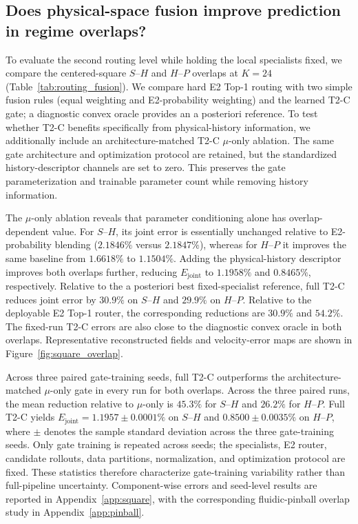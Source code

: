 \subsection{Does physical-space fusion improve prediction in regime overlaps?}
To evaluate the second routing level while holding the local specialists fixed, we compare the centered-square $S$--$H$ and $H$--$P$ overlaps at $K=24$ (Table~\ref{tab:routing_fusion}). We compare hard E2 Top-1 routing with two simple fusion rules (equal weighting and E2-probability weighting) and the learned T2-C gate; a diagnostic convex oracle provides an a posteriori reference. To test whether T2-C benefits specifically from physical-history information, we additionally include an architecture-matched T2-C $\mu$-only ablation. The same gate architecture and optimization protocol are retained, but the standardized history-descriptor channels are set to zero. This preserves the gate parameterization and trainable parameter count while removing history information.


The $\mu$-only ablation reveals that parameter conditioning alone has overlap-dependent value. For $S$--$H$, its joint error is essentially unchanged relative to E2-probability blending ($2.1846\%$ versus $2.1847\%$), whereas for $H$--$P$ it improves the same baseline from $1.6618\%$ to $1.1504\%$. Adding the physical-history descriptor improves both overlaps further, reducing $E_{\mathrm{joint}}$ to $1.1958\%$ and $0.8465\%$, respectively. Relative to the a posteriori best fixed-specialist reference, full T2-C reduces joint error by $30.9\%$ on $S$--$H$ and $29.9\%$ on $H$--$P$. Relative to the deployable E2 Top-1 router, the corresponding reductions are $30.9\%$ and $54.2\%$. The fixed-run T2-C errors are also close to the diagnostic convex oracle in both overlaps. Representative reconstructed fields and velocity-error maps are shown in Figure~\ref{fig:square_overlap}.

Across three paired gate-training seeds, full T2-C outperforms the architecture-matched $\mu$-only gate in every run for both overlaps.
Across the three paired runs, the mean reduction relative to $\mu$-only is $45.3\%$ for $S$--$H$ and $26.2\%$ for $H$--$P$. Full T2-C yields
$E_{\mathrm{joint}}=1.1957\pm0.0001\%$ on $S$--$H$ and $0.8500\pm0.0035\%$ on $H$--$P$, where $\pm$ denotes the sample standard
deviation across the three gate-training seeds. Only gate training is repeated across seeds; the specialists, E2 router, candidate rollouts, data partitions, normalization, and optimization protocol are fixed. These statistics therefore characterize gate-training variability rather than full-pipeline uncertainty. Component-wise errors and seed-level results are reported in Appendix~\ref{app:square}, with the corresponding fluidic-pinball overlap study in Appendix~\ref{app:pinball}.


